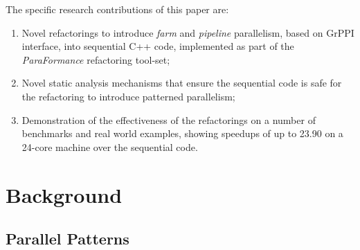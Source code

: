 The specific research contributions of this paper are:
\begin{enumerate}
    \item Novel refactorings to introduce \emph{farm} and \emph{pipeline} parallelism, based on GrPPI interface, into sequential C++ code, implemented as part of the \emph{ParaFormance} refactoring tool-set;
    \item Novel static analysis mechanisms that ensure the sequential code is safe for the refactoring to introduce patterned parallelism;
    \item Demonstration of the effectiveness of the refactorings on a number of benchmarks and real world examples, showing speedups of up to 23.90 on a 24-core machine over the sequential code.
\end{enumerate}




\section{Background}
\label{background}

\subsection{Parallel Patterns}



